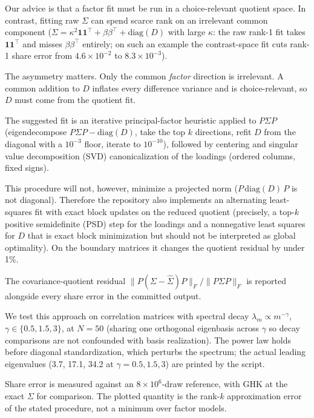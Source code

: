 \documentclass[12pt]{article}
\theoremstyle{remark}
\begin{document}
Our advice is that a factor fit must be run in a choice-relevant
quotient space. In contrast, fitting raw $\Sigma$ can spend
scarce rank on an irrelevant common component ($\Sigma = \kappa^2
\mathbf{1}\mathbf{1}^\top + \beta\beta^\top + \mathrm{diag}(D)$ with large $\kappa$: the
raw rank-1 fit takes $\mathbf{1}\mathbf{1}^\top$ and misses
$\beta\beta^\top$ entirely; on such an example the contrast-space fit cuts
rank-1 share error from $4.6\times10^{-2}$ to $8.3\times10^{-3}$).

The asymmetry matters. Only the common \emph{factor} direction is
irrelevant. A common addition to $D$ inflates every difference variance
and is choice-relevant, so $D$ must come from the quotient fit.

The suggested fit is an iterative principal-factor heuristic applied to $P\Sigma P$ (eigendecompose
$P\Sigma P - \mathrm{diag}(D)$, take the top $k$ directions, refit $D$ from
the diagonal with a $10^{-3}$ floor, iterate to $10^{-10}$), followed by
centering and singular value decomposition (SVD) canonicalization of the loadings (ordered columns, fixed
signs).

This procedure will not, however, minimize a projected norm
($P\,\mathrm{diag}(D)\,P$ is not diagonal). Therefore the repository also implements an alternating least-squares fit with
exact block updates on the reduced quotient (precisely, a top-$k$ positive semidefinite (PSD) step for the
loadings and a nonnegative least squares for $D$ that is exact block
minimization but should not be interpreted as global optimality). On
the boundary matrices it changes the quotient residual by under 1\%.

The covariance-quotient residual $\|P(\Sigma -
\hat\Sigma)P\|_F / \|P\Sigma P\|_F$ is reported alongside every share
error in the committed output.

We test this approach on correlation matrices with spectral decay
$\lambda_m \propto m^{-\gamma}$, $\gamma \in \{0.5, 1.5, 3\}$, at
$N=50$ (sharing one
orthogonal eigenbasis across $\gamma$ so decay comparisons are not
confounded with basis realization). The power law holds before diagonal
standardization, which perturbs the spectrum; the actual leading eigenvalues
(3.7, 17.1, 34.2 at $\gamma = 0.5, 1.5, 3$) are printed by the script.

Share error is measured against an $8\times10^6$-draw reference, with GHK
at the exact $\Sigma$ for comparison. The plotted quantity is the rank-$k$
approximation error of the stated procedure, not a minimum over factor
models.
\end{document}
